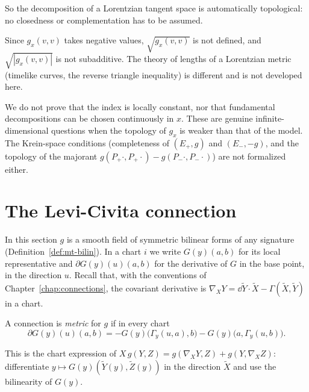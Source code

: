 So the decomposition of a Lorentzian tangent space is automatically topological: no closedness or
complementation has to be assumed.

\begin{remark}
  Since $g_x(v,v)$ takes negative values, $\sqrt{g_x(v,v)}$ is not defined, and $\sqrt{|g_x(v,v)|}$
  is not subadditive. The theory of lengths of a Lorentzian metric (timelike curves, the reverse
  triangle inequality) is different and is not developed here.
\end{remark}

\begin{remark}
  We do not prove that the index is locally constant, nor that fundamental decompositions can be
  chosen continuously in $x$. These are genuine infinite-dimensional questions when the topology
  of $g_x$ is weaker than that of the model. The Krein-space conditions (completeness of
  $(E_+, g)$ and $(E_-, -g)$, and the topology of the majorant $g(P_+\cdot, P_+\cdot) - g(P_-\cdot,
  P_-\cdot)$) are not formalized either.
\end{remark}

\section{The Levi-Civita connection}
\label{sec:mt-levi-civita}

In this section $g$ is a smooth field of symmetric bilinear forms of any signature
(Definition~\ref{def:mt-bilin}). In a chart $i$ we write $G(y)(a, b)$ for its local representative
and $\partial G(y)(u)(a, b)$ for the derivative of $G$ in the base point, in the direction $u$.
Recall that, with the conventions of Chapter~\ref{chap:connections}, the covariant derivative is
$\nabla_X Y = \dd \tilde Y \cdot \tilde X - \Gamma(\tilde X, \tilde Y)$ in a chart.

\begin{definition}
  \label{def:mt-metric-connection}
  \leanok
  A connection is \emph{metric} for $g$ if in every chart
  \[
    \partial G(y)(u)(a, b) = -G(y)\bigl(\Gamma_y(u, a), b\bigr) - G(y)\bigl(a, \Gamma_y(u, b)\bigr).
  \]
\end{definition}

This is the chart expression of $X\, g(Y, Z) = g(\nabla_X Y, Z) + g(Y, \nabla_X Z)$: differentiate
$y \mapsto G(y)(\tilde Y(y), \tilde Z(y))$ in the direction $\tilde X$ and use the bilinearity of
$G(y)$.

